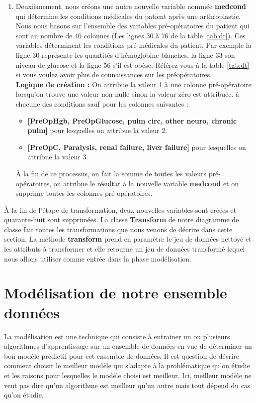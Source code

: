 \documentclass[12pt, french]{report}
\begin{document}
\begin{enumerate}[label=\Roman*.]
\item Deuxièmement, nous créons une autre nouvelle  variable nommée \textbf{medcond} qui détermine les conditions médicales du patient après une arthroplastie. Nous nous basons sur l'ensemble des variables pré-opératoires du patient qui sont au nombre de 46 colonnes (Les lignes 30 à 76 de la table \ref{tab:dt}). Ces variables déterminent les conditions pré-médicales du patient. Par exemple la ligne 30 représente les quantités d'hémoglobine blanches, la ligne 33  son niveau de glucose et la ligne 56 s'il est obèse. Référez-vous à la table \ref{tab:dt} si vous voulez avoir plus de connaissances sur les préopératoires.\\
\textbf{Logique de création : }  On attribue la valeur 1 à une colonne pré-opératoire lorsqu'on trouve une valeur non-nulle sinon la valeur zéro est attribuée. à chacune des conditions sauf pour les colonnes suivantes :
\begin{itemize}
\item \textbf{[PreOpHgb, PreOpGlucose, pulm circ, other neuro, chronic pulm]} pour lesquelles on attribue la valeur 2.
\item \textbf{[PreOpC, Paralysis, renal failure, liver failure]}  pour lesquelles on attribue la valeur 3.
\end{itemize}
À la fin de ce processus, on fait la somme de toutes les valeurs pré-opératoires, on attribue le résultat à la nouvelle variable \textbf{medcond} et on supprime toutes les colonnes pré-opératoires.
\end{enumerate}

À la fin de l'étape de transformation, deux nouvelles variables sont créées et quarante-huit sont supprimées. La classe \textbf{Transform} de notre diagramme de classe fait toutes les transformations que nous venons de décrire dans cette section. La méthode \textbf{transform} prend en paramètre le jeu de données nettoyé et les attributs à transformer et elle retourne un jeu de données transformé lequel nous allons utiliser comme entrée dans la phase modélisation. 

\section{Modélisation de notre ensemble données}

La modélisation est une technique qui consiste à entrainer un ou plusieurs algorithmes d'apprentissage sur un ensemble de données en vue de déterminer un bon modèle prédictif pour cet ensemble de données. Il est question de décrire comment choisir le meilleur modèle qui s'adapte à la problématique qu'on étudie et les raisons pour lesquelles le modèle choisi est meilleur. Ici, meilleur modèle ne veut pas dire qu'un algorithme est meilleur qu'un autre mais tout dépend du cas qu'on étudie.\\
\end{document}
